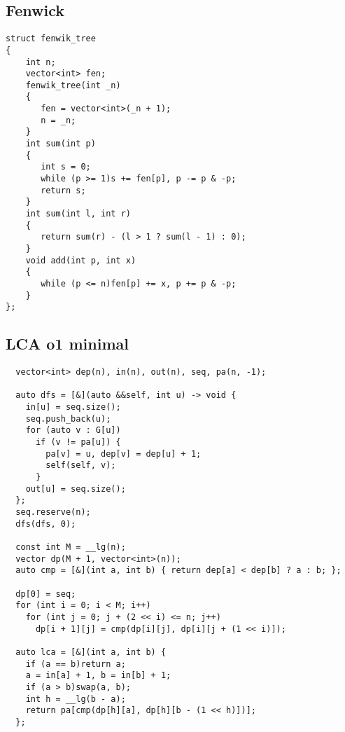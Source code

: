 \documentclass{article}
\begin{document}
\subsection{Fenwick}
\begin{verbatim}
struct fenwik_tree  
{  
    int n;  
    vector<int> fen;  
    fenwik_tree(int _n)  
    {  
       fen = vector<int>(_n + 1);  
       n = _n;  
    }
    int sum(int p)  
    {  
       int s = 0;  
       while (p >= 1)s += fen[p], p -= p & -p;  
       return s;  
    }  
    int sum(int l, int r)  
    {  
       return sum(r) - (l > 1 ? sum(l - 1) : 0);  
    }  
    void add(int p, int x)  
    {  
       while (p <= n)fen[p] += x, p += p & -p;  
    }  
};
\end{verbatim}

\subsection{LCA o1 minimal}
\begin{verbatim}
  vector<int> dep(n), in(n), out(n), seq, pa(n, -1);

  auto dfs = [&](auto &&self, int u) -> void {
	in[u] = seq.size();
	seq.push_back(u);
	for (auto v : G[u])
	  if (v != pa[u]) {
		pa[v] = u, dep[v] = dep[u] + 1;
		self(self, v);
	  }
	out[u] = seq.size();
  };
  seq.reserve(n);
  dfs(dfs, 0);

  const int M = __lg(n);
  vector dp(M + 1, vector<int>(n));
  auto cmp = [&](int a, int b) { return dep[a] < dep[b] ? a : b; };

  dp[0] = seq;
  for (int i = 0; i < M; i++)
	for (int j = 0; j + (2 << i) <= n; j++)
	  dp[i + 1][j] = cmp(dp[i][j], dp[i][j + (1 << i)]);

  auto lca = [&](int a, int b) {
	if (a == b)return a;
	a = in[a] + 1, b = in[b] + 1;
	if (a > b)swap(a, b);
	int h = __lg(b - a);
	return pa[cmp(dp[h][a], dp[h][b - (1 << h)])];
  };
\end{verbatim}
\end{document}
